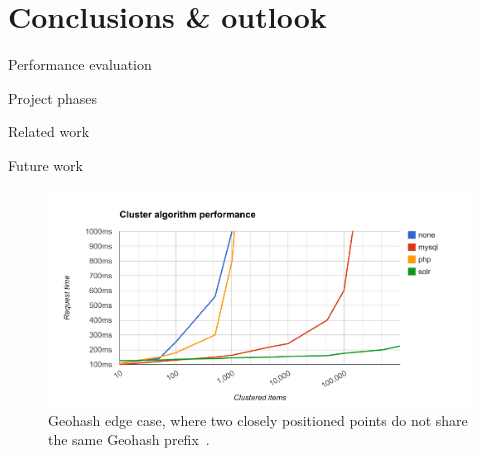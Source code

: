 
%
%

\chapter{Conclusions \& outlook}

Performance evaluation

Project phases

Related work

Future work



\begin{figure}[h]
  \begin{center}
    \includegraphics[width=1.2\textwidth]{figures/geocluster_algorithm_performance.pdf}
    \caption{Geohash edge case, where two closely positioned points do not share the same Geohash prefix~\cite{Smiley11geohash}.}
    \label{fig:geohash-edge}
  \end{center}
\end{figure}